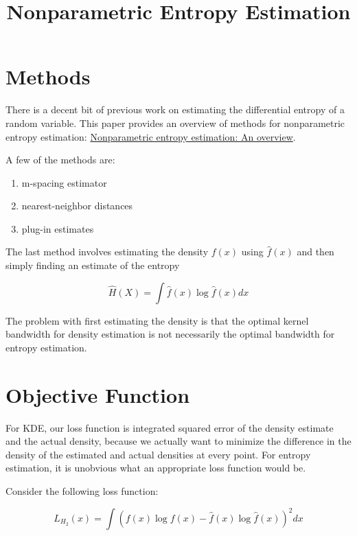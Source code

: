 \documentclass{amsart}
\title{Nonparametric Entropy Estimation}
\begin{document}
\maketitle

\section{Methods}

There is a decent bit of previous work on estimating the differential entropy of a random variable. This paper provides an overview of methods for nonparametric entropy estimation: \href{http://ecf.caltech.edu/summerlecture/docs/Entropy\%20estimation.pdf}{Nonparametric entropy estimation: An overview}.


A few of the methods are:
\begin{enumerate}
\item m-spacing estimator
\item nearest-neighbor distances
\item plug-in estimates
\end{enumerate}

The last method involves estimating the density $f(x)$ using $\hat{f}(x)$ and then simply finding an estimate of the entropy

\begin{displaymath}
\hat{H}(X) = \int \hat{f}(x) \log \hat{f}(x) dx
\end{displaymath}

The problem with first estimating the density is that the optimal kernel bandwidth for density estimation is not necessarily the optimal bandwidth for entropy estimation.

\section{Objective Function}

For KDE, our loss function is integrated squared error of the density estimate and the actual density, because we actually want to minimize the difference in the density of the estimated and actual densities at every point. For entropy estimation, it is unobvious what an appropriate loss function would be.

Consider the following loss function:

\begin{displaymath}
L_{H_2}(x) = \int (f(x) \log f(x) - \hat{f}(x) \log \hat{f}(x))^2 dx
\end{displaymath}
\end{document}
